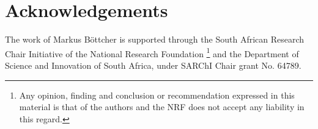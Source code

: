 \documentclass[twocolumn, tighten, twocolappendix]{aastex63}
\begin{document}
\section*{Acknowledgements}
The work of Markus B{\"o}ttcher is supported through the South African Research Chair Initiative of the National Research Foundation \footnote{Any opinion, finding and conclusion or recommendation expressed in this material is that of the authors and the NRF does not accept any liability in this regard.} and the Department of Science and Innovation of South Africa, under SARChI Chair grant No. 64789.
{}

\end{document}
